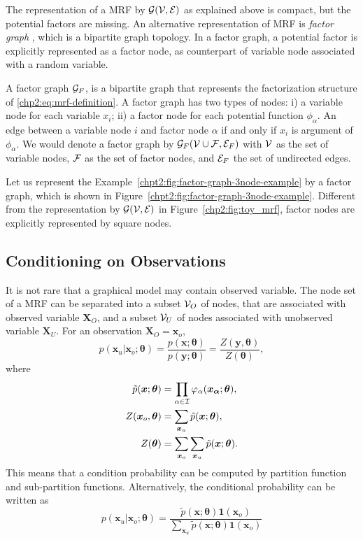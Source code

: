 The representation of a MRF by $\mathcal{G}(\mathcal{V}, \mathcal{E})$ as explained above is compact, but the potential factors are missing. An alternative representation of MRF is \textit{factor graph} \cite{kschischang2001factor_graph},
which is a bipartite graph topology. In a factor graph, a potential factor is explicitly represented as a factor node, as counterpart of variable node associated with a random variable.
\begin{definition}\label{chpt2:def:factor-graph}
  A factor graph $\mathcal{G}_F$, is a bipartite graph that represents the factorization structure of \eqref{chp2:eq:mrf-definition}. A factor graph has two types of nodes: i) a variable node for each variable $x_i$; ii) a factor node for each potential function $\phi_{\alpha}$. An edge between a variable node $i$ and factor node $\alpha$ if and only if $x_i$ is argument of $\phi_{\alpha}$. We would denote a factor graph by $\mathcal{G}_F(\mathcal{V} \cup \mathcal{F}, \mathcal{E}_F)$ with $\mathcal{V}$ as the set of variable nodes, $\mathcal{F}$ as the set of factor nodes, and $\mathcal{E}_F$ the set of undirected edges.
\end{definition}
\begin{example}
  Let us represent the Example~\ref{chpt2:fig:factor-graph-3node-example} by a factor graph, which is shown in Figure~\ref{chpt2:fig:factor-graph-3node-example}. Different from the representation by $\mathcal{G}(\mathcal{V}, \mathcal{E})$ in Figure~\ref{chp2:fig:toy_mrf}, factor nodes are explicitly represented by square nodes.
\end{example}


\subsection{Conditioning on Observations}
It is not rare that a graphical model may contain observed variable. The node set of a MRF can be separated into a subset $\mathcal{V}_O$ of nodes, that are associated with observed variable $\bm{X}_O$, and a subset $\mathcal{V}_U$ of nodes associated with unobserved variable $\bm{X}_U$. For an observation $\bm{X}_O=\bm{x}_o$,
\begin{equation}
  p(\bm{x}_u|\bm{x}_o;\bm{\theta}) = \frac{p(\bm{x}; \bm{\theta})}{p(\bm{y};\bm{\theta})} =  \frac{Z(\bm{y},\bm{\theta})}{Z(\bm{\theta})},
\end{equation}
where 
\begin{align}
  \tilde{p}(\bm{x}; \bm{\theta}) &= \prod_{\alpha \in \mathcal{I}} \varphi_{\alpha}(\bm{x_{\alpha}};\bm{\theta}), \nonumber \\
  Z(\bm{x}_o, \bm{\theta}) &= \sum_{\bm{x}_u} \tilde{p}(\bm{x}; \bm{\theta}), \nonumber \\
  Z(\bm{\theta}) &= \sum_{\bm{x}_o}\sum_{\bm{x}_u} \tilde{p}(\bm{x}; \bm{\theta}).
\end{align}
This means that a condition probability can be computed by partition function and sub-partition functions. Alternatively, the conditional probability can be written as
\begin{equation}
  p(\bm{x}_u|\bm{x}_o;\bm{\theta}) = \frac{\tilde{p}(\bm{x}; \bm{\theta})\bm{1}(\bm{x}_o)}{\sum_{\bm{x}_u}\tilde{p}(\bm{x}; \bm{\theta})\bm{1}(\bm{x}_o)}
\end{equation}

